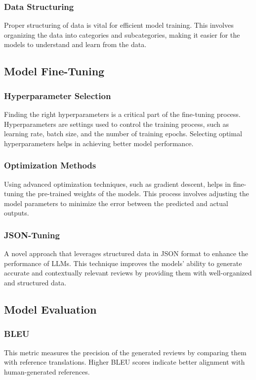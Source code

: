 \subsubsection{Data Structuring}
Proper structuring of data is vital for efficient model training. This involves organizing the data into categories and subcategories, making it easier for the models to understand and learn from the data.

\subsection{Model Fine-Tuning}
\subsubsection{Hyperparameter Selection}
Finding the right hyperparameters is a critical part of the fine-tuning process. Hyperparameters are settings used to control the training process, such as learning rate, batch size, and the number of training epochs. Selecting optimal hyperparameters helps in achieving better model performance.

\subsubsection{Optimization Methods}
Using advanced optimization techniques, such as gradient descent, helps in fine-tuning the pre-trained weights of the models. This process involves adjusting the model parameters to minimize the error between the predicted and actual outputs.

\subsubsection{JSON-Tuning}
A novel approach that leverages structured data in JSON format to enhance the performance of LLMs. This technique improves the models' ability to generate accurate and contextually relevant reviews by providing them with well-organized and structured data.

\subsection{Model Evaluation}
\subsubsection{BLEU}
This metric measures the precision of the generated reviews by comparing them with reference translations. Higher BLEU scores indicate better alignment with human-generated references.

